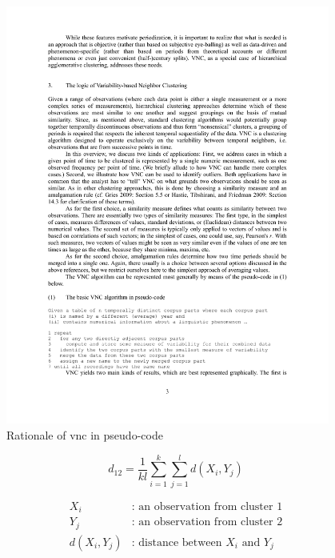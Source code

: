 \begin{figure}[H]
  \centering
  \includegraphics[width=0.95\textwidth,keepaspectratio]{figures_ref/Gries_and_Hilpert_2012_VNC_algo.pdf}
  \caption{Rationale of \gls{vnc} in pseudo-code \parencite{gries2012variability}}
  \label{fig:vnc_pseudocode}
\end{figure}

\begin{equation}
  d_{12} = \frac{1}{kl}\displaystyle\sum\limits_{i=1}^k {\displaystyle\sum\limits_{j=1}^l d(X_i, Y_j)}
  \label{equ:avg_linkage_func}
\end{equation}

\begin{equation*}
  \begin{aligned}
    X_i &\text{: an observation from cluster 1} \\
    Y_j &\text{: an observation from cluster 2} \\
    d(X_i, Y_j) &\text{: distance between } X_i \text{ and } Y_j
  \end{aligned}
\end{equation*}

